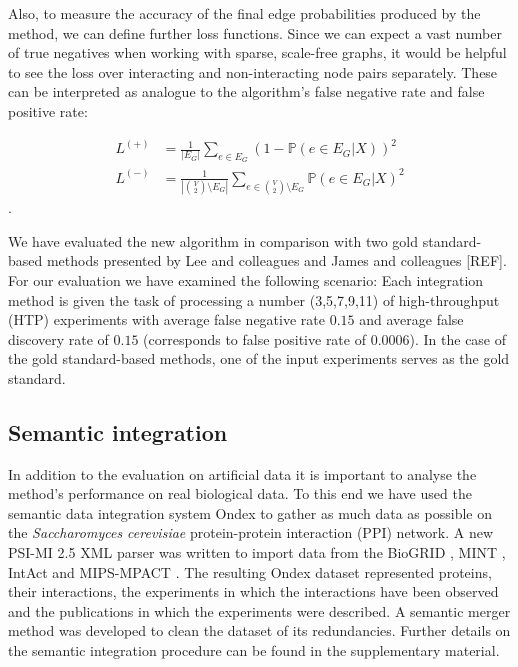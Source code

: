 \documentclass{bioinfo}
\newcommand{\prob}{\mathbb{P}}
\newcommand{\species}[1]{\textit{#1}}
\newcommand{\REF}{{\color{red}[REF]}}
\begin{document}
\begin{methods}
Also, to measure the accuracy of the final edge probabilities produced by the method, we can define further loss functions. Since we can expect a vast number of true negatives when working with sparse, scale-free graphs, it would be helpful to see the loss over interacting and non-interacting node pairs separately. These can be interpreted as analogue to the algorithm's false negative rate and false positive rate:

\begin{align} 
	L^{(+)} &= \frac{1}{|E_G|}\sum_{e \in E_G} (1 - \prob(e \in E_G|X))^2\\
	L^{(-)} &= \frac{1}{|\binom{V}{2} \setminus E_G|}\sum_{e \in \binom{V}{2} \setminus E_G} \prob(e \in E_G|X)^2
\end{align}.

We have evaluated the new algorithm in comparison with two gold standard-based methods presented by Lee and colleagues \citep{lee_probabilistic_2004} and James and colleagues \REF. For our evaluation we have examined the following scenario: Each integration method is given the task of processing a number (3,5,7,9,11) of high-throughput (HTP) experiments with average false negative rate $0.15$ and average false discovery rate of $0.15$ (corresponds to false positive rate of 0.0006). In the case of the gold standard-based methods, one of the input experiments serves as the gold standard.

\subsection{Semantic integration}

In addition to the evaluation on artificial data it is important to analyse the method's performance on real biological data. To this end we have used the semantic data integration system Ondex \citep{koehler_graph-based_2006} to gather as much data as possible on the \species{Saccharomyces cerevisiae} protein-protein interaction (PPI) network. A new PSI-MI 2.5 XML \citep{kerrien_broadening_2007} parser was written to import data from the BioGRID \citep{breitkreutz_biogrid_2008}, MINT \citep{chatr-aryamontri_mint:_2007}, IntAct \citep{hermjakob_intact:_2004} and MIPS-MPACT \citep{guldener_mpact:_2006}. The resulting Ondex dataset represented proteins, their interactions, the experiments in which the interactions have been observed and the publications in which the experiments were described. A semantic merger method was developed to clean the dataset of its redundancies. Further details on the semantic integration procedure can be found in the supplementary material.

\end{methods}
\end{document}
